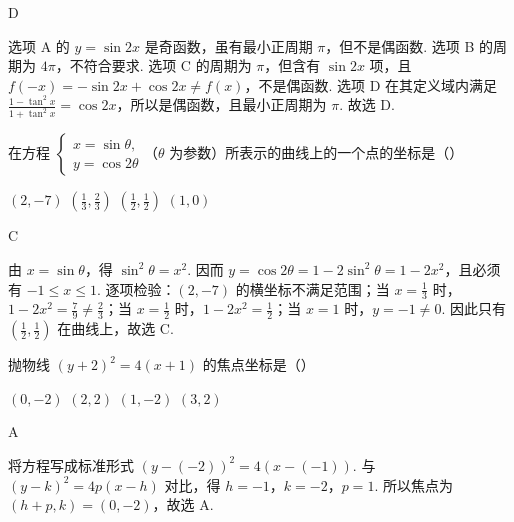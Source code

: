 \documentclass[UTF8,a4paper,oneside,11pt]{ctexbook}
\begin{document}
\begin{answer}
D
\end{answer}

\begin{solution}
选项 A 的 \(y=\sin2x\) 是奇函数，虽有最小正周期 \(\pi\)，但不是偶函数. 选项 B 的周期为 \(4\pi\)，不符合要求. 选项 C 的周期为 \(\pi\)，但含有 \(\sin2x\) 项，且 \(f(-x)=-\sin2x+\cos2x\ne f(x)\)，不是偶函数. 选项 D 在其定义域内满足
\(\frac{1-\tan^2x}{1+\tan^2x}=\cos2x\)，所以是偶函数，且最小正周期为 \(\pi\). 故选 D.
\end{solution}

\begin{problem}
在方程 \(\begin{cases}
x = \sin \theta,\\
y = \cos 2\theta
\end{cases}\)（\(\theta\) 为参数）所表示的曲线上的一个点的坐标是（\quad）

\choices
    {\((2,-7)\)}
    {\(\left(\frac{1}{3}, \frac{2}{3}\right)\)}
    {\(\left(\frac{1}{2}, \frac{1}{2}\right)\)}
    {\((1,0)\)}
\end{problem}

\begin{answer}
C
\end{answer}

\begin{solution}
由 \(x=\sin\theta\)，得 \(\sin^2\theta=x^2\). 因而 \(y=\cos2\theta=1-2\sin^2\theta=1-2x^2\)，且必须有 \(-1\leqslant x\leqslant1\). 逐项检验：\((2,-7)\) 的横坐标不满足范围；当 \(x=\frac{1}{3}\) 时，\(1-2x^2=\frac{7}{9}\ne\frac{2}{3}\)；当 \(x=\frac{1}{2}\) 时，\(1-2x^2=\frac{1}{2}\)；当 \(x=1\) 时，\(y=-1\ne0\). 因此只有 \(\left(\frac{1}{2},\frac{1}{2}\right)\) 在曲线上，故选 C.
\end{solution}

\begin{problem}
抛物线 \((y + 2)^2 = 4(x + 1)\) 的焦点坐标是（\quad）

\choices
    {\((0,-2)\)}
    {\((2,2)\)}
    {\((1,-2)\)}
    {\((3,2)\)}
\end{problem}

\begin{answer}
A
\end{answer}

\begin{solution}
将方程写成标准形式 \(\left(y-(-2)\right)^2=4\left(x-(-1)\right)\). 与 \((y-k)^2=4p(x-h)\) 对比，得 \(h=-1\)，\(k=-2\)，\(p=1\). 所以焦点为 \((h+p,k)=(0,-2)\)，故选 A.
\end{solution}
\end{document}
